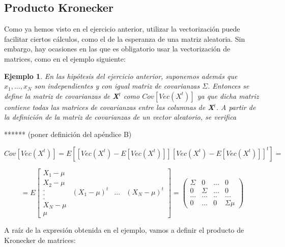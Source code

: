 \documentclass{article}
\theoremstyle{theorem-style}  %
\theoremstyle{definition}
\theoremstyle{example-style}
\newtheorem{example}{Ejemplo}[section]
\begin{document}
\subsection{Producto Kronecker}

	Como ya hemos visto en el ejercicio anterior, utilizar la vectorización puede facilitar ciertos cálculos, como el de la esperanza de una matriz aleatoria. Sin embargo, hay ocasiones en las que es obligatorio usar la vectorización de matrices, como en el ejemplo siguiente:
	
	\begin{example}
		\textit{En las hipótesis del ejercicio anterior, suponemos además que $x_1, ..., x_N$ son independientes y con igual matriz de covarianzas $\Sigma$. Entonces se define la matriz de covarianzas de \textbf{X}$^t$ como $Cov[Vec(X^t)]$ ya que dicha matriz contiene todas las matrices de covarianzas entre las columnas de \textbf{X}$^t$. A partir de la definición de la matriz de covarianzas de un vector aleatorio, se verifica}
		
		****** (poner definición del apéndice B)
		
		$$Cov[Vec(X^t)] = E[[Vec(X^t)  - E[Vec(X^t)]] [Vec(X^t) - E[Vec(X^t)]]^t] = $$
		
		
		$$=E \left[{\begin{array}{c}
			X_1 - \mu\\
			X_2 - \mu\\
			.\\
			.\\
			.\\
			X_N - \mu\\
			\mu
			\end{array}}{\begin{array}{ccc}
			(X_1 - \mu)^t & ... &	(X_N- \mu)^t\\
			\end{array} }\right] =	 \left( {\begin{array}{cccc}
			\Sigma & 0 & ... & 0\\
			0 & \Sigma & ... & 0\\
			... & ... & .. & ... \\
			0 & ... & 0 & \Sigma\mu
			\end{array}}\right) $$
		
	\end{example}

	A raíz de la expresión obtenida en el ejemplo, vamos a definir el producto de Kronecker de matrices:
	
\end{document}
